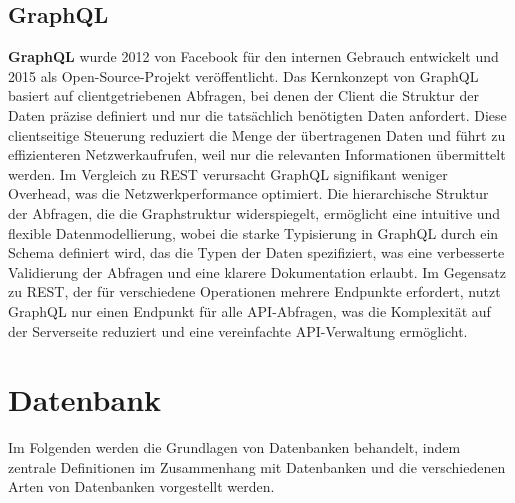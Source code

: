 \subsection{GraphQL} %
\label{sec:graphql}
\textbf{GraphQL} wurde 2012 von Facebook für den internen Gebrauch entwickelt und 2015 als Open-Source-Projekt veröffentlicht. Das Kernkonzept von GraphQL basiert auf clientgetriebenen Abfragen, bei denen der Client die Struktur der Daten präzise definiert und nur die tatsächlich benötigten Daten anfordert. Diese clientseitige Steuerung reduziert die Menge der übertragenen Daten und führt zu effizienteren Netzwerkaufrufen, weil nur die relevanten Informationen übermittelt werden. Im Vergleich zu REST verursacht GraphQL signifikant weniger Overhead, was die Netzwerkperformance optimiert. Die hierarchische Struktur der Abfragen, die die Graphstruktur widerspiegelt, ermöglicht eine intuitive und flexible Datenmodellierung, wobei die starke Typisierung in GraphQL durch ein Schema definiert wird, das die Typen der Daten spezifiziert, was eine verbesserte Validierung der Abfragen und eine klarere Dokumentation erlaubt. Im Gegensatz zu REST, der für verschiedene Operationen mehrere Endpunkte erfordert, nutzt GraphQL nur einen Endpunkt für alle API-Abfragen, was die Komplexität auf der Serverseite reduziert und eine vereinfachte API-Verwaltung ermöglicht. \citep{graphqlreplacerest}

\section{Datenbank} %
\label{sec:datenbankGrundlagen}
Im Folgenden werden die Grundlagen von Datenbanken behandelt, indem zentrale Definitionen im Zusammenhang mit Datenbanken und die verschiedenen Arten von Datenbanken vorgestellt werden.
